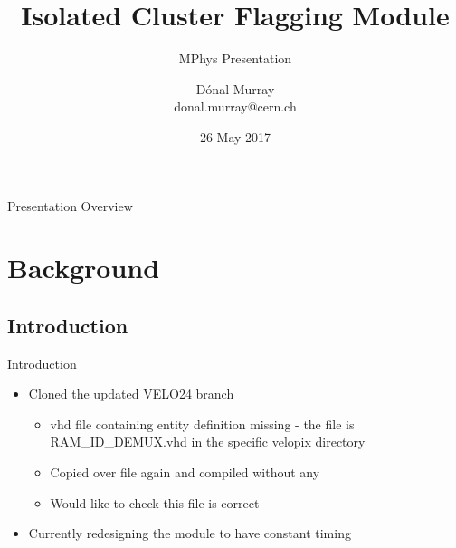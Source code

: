 \documentclass{beamer}
\title[ICF Module]{Isolated Cluster Flagging Module}
\subtitle{MPhys Presentation}
\author[Dónal Murray\hspace*{80pt}donal.murray@cern.ch]{Dónal Murray \\
  \vskip7pt
  \tiny{donal.murray@cern.ch}
}
\institute{}
\date{26 May 2017}
\begin{document}
{
\begin{frame}
  \titlepage
\end{frame}
}
\addtocounter{framenumber}{-1} %

\begin{frame}{Presentation Overview}
  \tableofcontents
\end{frame}





\section{Background}
\subsection{Introduction}
\begin{frame}{Introduction}
  \begin{itemize}
    \item
      Cloned the updated VELO24 branch
      \begin{itemize}
        \item
          vhd file containing entity definition missing - the file is RAM\_ID\_DEMUX.vhd
          in the specific velopix directory
        \item
          Copied over file again and compiled without any
        \item
          Would like to check this file is correct
      \end{itemize}
    \item
      Currently redesigning the module to have constant timing
    \end{itemize}
\end{frame}
\end{document}
